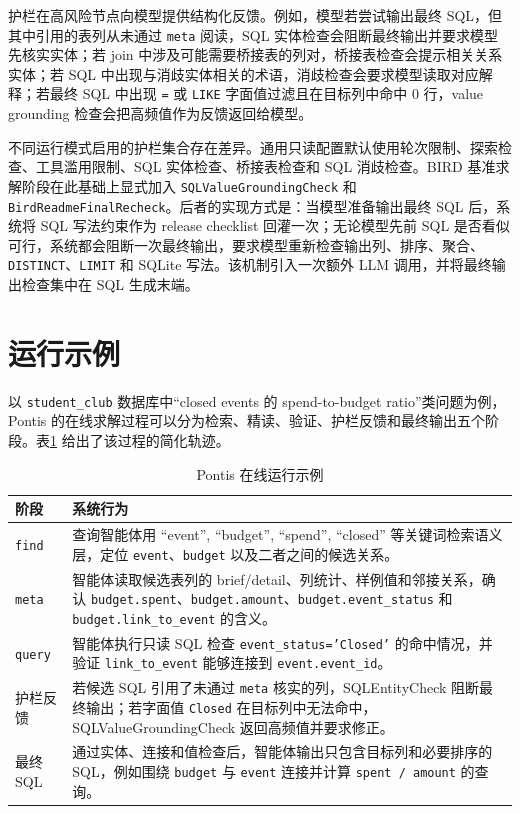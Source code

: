 \documentclass[
    bachelor,
    pdflinks,
]{xjtuthesis}
\newcommand{\topcaption}[1]{\caption{#1}}
\begin{document}
护栏在高风险节点向模型提供结构化反馈。例如，模型若尝试输出最终 SQL，但其中引用的表列从未通过 \texttt{meta} 阅读，SQL 实体检查会阻断最终输出并要求模型先核实实体；若 join 中涉及可能需要桥接表的列对，桥接表检查会提示相关关系实体；若 SQL 中出现与消歧实体相关的术语，消歧检查会要求模型读取对应解释；若最终 SQL 中出现 \texttt{=} 或 \texttt{LIKE} 字面值过滤且在目标列中命中 0 行，value grounding 检查会把高频值作为反馈返回给模型。

不同运行模式启用的护栏集合存在差异。通用只读配置默认使用轮次限制、探索检查、工具滥用限制、SQL 实体检查、桥接表检查和 SQL 消歧检查。BIRD 基准求解阶段在此基础上显式加入 \texttt{SQLValueGroundingCheck} 和 \texttt{BirdReadmeFinalRecheck}。后者的实现方式是：当模型准备输出最终 SQL 后，系统将 SQL 写法约束作为 release checklist 回灌一次；无论模型先前 SQL 是否看似可行，系统都会阻断一次最终输出，要求模型重新检查输出列、排序、聚合、\texttt{DISTINCT}、\texttt{LIMIT} 和 SQLite 写法。该机制引入一次额外 LLM 调用，并将最终输出检查集中在 SQL 生成末端。

\section{运行示例}

以 \texttt{student\_club} 数据库中“closed events 的 spend-to-budget ratio”类问题为例，Pontis 的在线求解过程可以分为检索、精读、验证、护栏反馈和最终输出五个阶段。表\ref{tab:runtime_example} 给出了该过程的简化轨迹。

\begin{table}[htbp]\small
  \centering
  \topcaption{Pontis 在线运行示例}
  \label{tab:runtime_example}
  \begin{tabularx}{\textwidth}{lX}
    \toprule[1.5pt]
    \textbf{阶段} & \textbf{系统行为} \\
    \midrule[1pt]
    \texttt{find} & 查询智能体用 ``event'', ``budget'', ``spend'', ``closed'' 等关键词检索语义层，定位 \texttt{event}、\texttt{budget} 以及二者之间的候选关系。 \\
    \texttt{meta} & 智能体读取候选表列的 brief/detail、列统计、样例值和邻接关系，确认 \texttt{budget.spent}、\texttt{budget.amount}、\texttt{budget.event\_status} 和 \texttt{budget.link\_to\_event} 的含义。 \\
    \texttt{query} & 智能体执行只读 SQL 检查 \texttt{event\_status='Closed'} 的命中情况，并验证 \texttt{link\_to\_event} 能够连接到 \texttt{event.event\_id}。 \\
    护栏反馈 & 若候选 SQL 引用了未通过 \texttt{meta} 核实的列，SQLEntityCheck 阻断最终输出；若字面值 \texttt{Closed} 在目标列中无法命中，SQLValueGroundingCheck 返回高频值并要求修正。 \\
    最终 SQL & 通过实体、连接和值检查后，智能体输出只包含目标列和必要排序的 SQL，例如围绕 \texttt{budget} 与 \texttt{event} 连接并计算 \texttt{spent / amount} 的查询。 \\
    \bottomrule[1.5pt]
  \end{tabularx}
\end{table}
\end{document}
